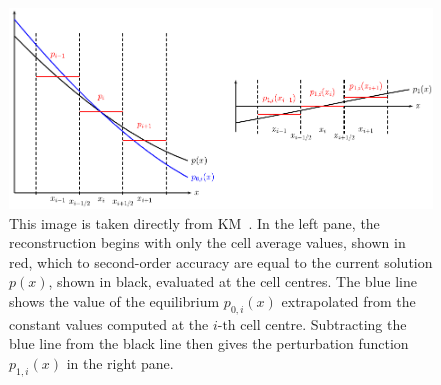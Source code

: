 \begin {figure}
\centering
\includegraphics[width=13cm]{figures/Kaeppeli1}
\caption{This image is taken directly from KM~\cite{Kappeli2014}. In the left pane, the reconstruction begins with only the cell average values, shown in red, which to second-order accuracy are equal to the current solution $p(x)$, shown in black, evaluated at the cell centres. The blue line shows the value of the equilibrium $p_{0,i}(x)$ extrapolated from the constant values computed at the $i\textrm{-th}$ cell centre. Subtracting the blue line from the black line then gives the perturbation function $p_{1,i}(x)$ in the right pane.}
\label{fig:Kappeli1}
\end{figure}

